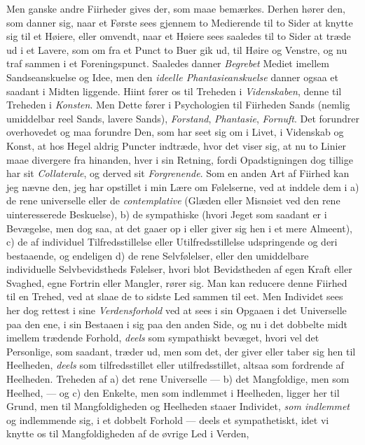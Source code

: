 \documentclass[12pt,a4paper]{book}
\newcommand{\apage}[1]{\marginnote{\footnotesize\textit{[#1]}}}
\begin{document}
\apage{133} Men ganske andre Fiirheder gives der, som maae bemærkes. Derhen hører den, som
danner sig, naar et Første sees gjennem to Medierende til to Sider at knytte sig
til et Høiere, eller omvendt, naar et Høiere sees saaledes til to Sider at træde
ud i et Lavere, som om fra et Punct to Buer gik ud, til Høire og Venstre, og nu
traf sammen i et Foreningspunct. Saaledes danner \emph{Begrebet} Mediet imellem
Sandseanskuelse og Idee, men den \emph{ideelle Phantasieanskuelse} danner ogsaa et
saadant i Midten liggende. Hiint fører os til Treheden i \emph{Videnskaben}, denne til
Treheden i \emph{Konsten}. Men Dette fører i Psychologien til Fiirheden Sands (nemlig
umiddelbar reel Sands, lavere Sands), \emph{Forstand}, \emph{Phantasie}, \emph{Fornuft}. Det
forundrer overhovedet og maa forundre Den, som har seet sig om i Livet, i
Videnskab og Konst, at hos Hegel aldrig Puncter indtræde, hvor det viser sig, at
nu to Linier maae divergere fra hinanden, hver i sin Retning, fordi
Opadstigningen dog tillige har sit \emph{Collaterale}, og derved sit \emph{Forgrenende}. Som
en anden Art af Fiirhed kan jeg nævne den, jeg har opstillet i min Lære om
Følelserne, ved at inddele dem i a) de rene universelle eller de
\emph{contemplative} (Glæden eller Misnøiet ved den rene uinteresserede
Beskuelse), b) de sympathiske (hvori Jeget som saadant er i Bevægelse, men dog
saa, at det gaaer op i eller giver sig hen i et mere Almeent), c) de af
individuel Tilfredsstillelse eller Utilfredsstillelse udspringende og deri
bestaaende, og endeligen d) de rene Selvfølelser, eller den umiddelbare
individuelle Selvbevidstheds Følelser, hvori blot Bevidstheden af egen Kraft
eller Svaghed, egne Fortrin eller Mangler, rører sig. Man kan reducere denne
Fiirhed til en Trehed, ved at slaae de to sidste Led sammen til eet. Men
Individet sees her dog rettest i sine \emph{Verdensforhold} ved at sees i sin Opgaaen i
det Universelle paa den ene, i sin Bestaaen i sig paa den anden Side, og nu i
det dobbelte midt imellem trædende Forhold, \emph{deels} som sympathiskt bevæget, hvori
vel \apage{134} det Personlige, som saadant, træder ud, men som det, der giver eller taber
sig hen til Heelheden, \emph{deels} som tilfredsstillet eller utilfredsstillet, altsaa
som fordrende af Heelheden. Treheden af a) det rene Universelle --- b) det
Mangfoldige, men som Heelhed, --- og c) den Enkelte, men som indlemmet i
Heelheden, ligger her til Grund, men til Mangfoldigheden og Heelheden staaer
Individet, \emph{som indlemmet} og indlemmende sig, i et dobbelt Forhold --- deels et
sympathetiskt, idet vi knytte os til Mangfoldigheden af de øvrige Led i Verden,
\end{document}
